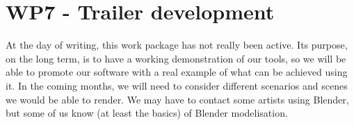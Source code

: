 \section{WP7 - Trailer development}

At the day of writing, this work package has not really been active. Its purpose, on the long term, is to have a working demonstration of our tools, so we will be able to promote our software with a real example of what can be achieved using it. In the coming months, we will need to consider different scenarios and scenes we would be able to render. We may have to contact some artists using Blender, but some of us know (at least the basics) of Blender modelisation.
